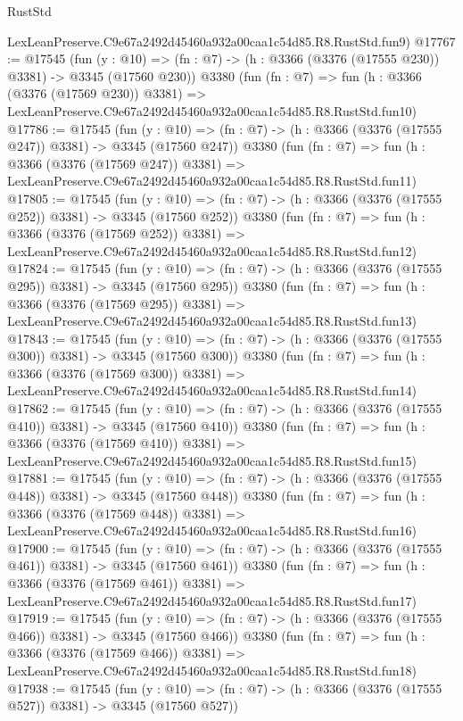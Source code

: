 \begin{lexlean}{RustStd}
\begin{coremodule}
    LexLeanPreserve.C9e67a2492d45460a932a00caa1c54d85.R8.RustStd.fun9)
@17767 := @17545
    (fun (y : @10) => (fn : @7) -> (h : @3366 (@3376 (@17555 @230)) @3381) -> @3345 (@17560 @230))
    @3380
    (fun (fn : @7) =>
    fun (h : @3366 (@3376 (@17569 @230)) @3381) =>
    LexLeanPreserve.C9e67a2492d45460a932a00caa1c54d85.R8.RustStd.fun10)
@17786 := @17545
    (fun (y : @10) => (fn : @7) -> (h : @3366 (@3376 (@17555 @247)) @3381) -> @3345 (@17560 @247))
    @3380
    (fun (fn : @7) =>
    fun (h : @3366 (@3376 (@17569 @247)) @3381) =>
    LexLeanPreserve.C9e67a2492d45460a932a00caa1c54d85.R8.RustStd.fun11)
@17805 := @17545
    (fun (y : @10) => (fn : @7) -> (h : @3366 (@3376 (@17555 @252)) @3381) -> @3345 (@17560 @252))
    @3380
    (fun (fn : @7) =>
    fun (h : @3366 (@3376 (@17569 @252)) @3381) =>
    LexLeanPreserve.C9e67a2492d45460a932a00caa1c54d85.R8.RustStd.fun12)
@17824 := @17545
    (fun (y : @10) => (fn : @7) -> (h : @3366 (@3376 (@17555 @295)) @3381) -> @3345 (@17560 @295))
    @3380
    (fun (fn : @7) =>
    fun (h : @3366 (@3376 (@17569 @295)) @3381) =>
    LexLeanPreserve.C9e67a2492d45460a932a00caa1c54d85.R8.RustStd.fun13)
@17843 := @17545
    (fun (y : @10) => (fn : @7) -> (h : @3366 (@3376 (@17555 @300)) @3381) -> @3345 (@17560 @300))
    @3380
    (fun (fn : @7) =>
    fun (h : @3366 (@3376 (@17569 @300)) @3381) =>
    LexLeanPreserve.C9e67a2492d45460a932a00caa1c54d85.R8.RustStd.fun14)
@17862 := @17545
    (fun (y : @10) => (fn : @7) -> (h : @3366 (@3376 (@17555 @410)) @3381) -> @3345 (@17560 @410))
    @3380
    (fun (fn : @7) =>
    fun (h : @3366 (@3376 (@17569 @410)) @3381) =>
    LexLeanPreserve.C9e67a2492d45460a932a00caa1c54d85.R8.RustStd.fun15)
@17881 := @17545
    (fun (y : @10) => (fn : @7) -> (h : @3366 (@3376 (@17555 @448)) @3381) -> @3345 (@17560 @448))
    @3380
    (fun (fn : @7) =>
    fun (h : @3366 (@3376 (@17569 @448)) @3381) =>
    LexLeanPreserve.C9e67a2492d45460a932a00caa1c54d85.R8.RustStd.fun16)
@17900 := @17545
    (fun (y : @10) => (fn : @7) -> (h : @3366 (@3376 (@17555 @461)) @3381) -> @3345 (@17560 @461))
    @3380
    (fun (fn : @7) =>
    fun (h : @3366 (@3376 (@17569 @461)) @3381) =>
    LexLeanPreserve.C9e67a2492d45460a932a00caa1c54d85.R8.RustStd.fun17)
@17919 := @17545
    (fun (y : @10) => (fn : @7) -> (h : @3366 (@3376 (@17555 @466)) @3381) -> @3345 (@17560 @466))
    @3380
    (fun (fn : @7) =>
    fun (h : @3366 (@3376 (@17569 @466)) @3381) =>
    LexLeanPreserve.C9e67a2492d45460a932a00caa1c54d85.R8.RustStd.fun18)
@17938 := @17545
    (fun (y : @10) => (fn : @7) -> (h : @3366 (@3376 (@17555 @527)) @3381) -> @3345 (@17560 @527))

\end{coremodule}
\end{lexlean}
